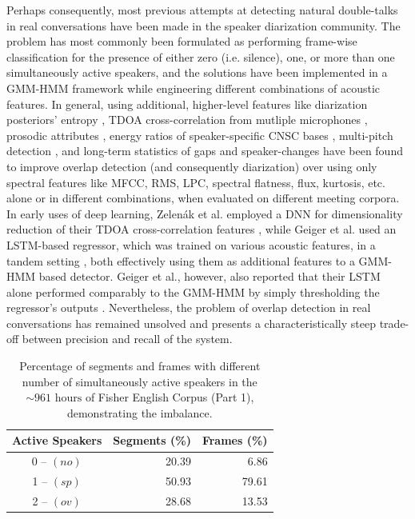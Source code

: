 \documentclass[a4paper]{article}
\begin{document}
Perhaps consequently, most previous attempts at detecting natural double-talks in real conversations
have been made in the speaker diarization community.
The problem has most commonly been formulated as performing frame-wise classification
for the presence of either
zero (i.e. silence), one, or more than one simultaneously active speakers,
and the solutions have been implemented in a GMM-HMM framework
while engineering different combinations of acoustic features.
In general, using additional, higher-level features like
diarization posteriors' entropy \cite{boakye_overlapped_2008},
TDOA cross-correlation from mutliple microphones \cite{zelenak_simultaneous_2012},
prosodic attributes \cite{zelenak_speaker_2012},
energy ratios of speaker-specific CNSC bases \cite{vipperla_speech_2012,geiger_speech_2012-1},
multi-pitch detection \cite{charlet_impact_2013},
and long-term statistics of gaps and speaker-changes \cite{yella_overlapping_2014}
have been found to improve overlap detection (and consequently diarization)
over using only spectral features like MFCC, RMS, LPC, spectral flatness, flux, kurtosis, etc.
alone or in different combinations, when evaluated on different meeting corpora.
In early uses of deep learning,
Zelen\'{a}k et al. employed a DNN for dimensionality reduction of their TDOA cross-correlation features \cite{zelenak_simultaneous_2012},
while Geiger et al. used an LSTM-based regressor,
which was trained on various acoustic features, in a tandem setting \cite{geiger_detecting_2013},
both effectively using them as additional features to a GMM-HMM based detector.
Geiger et al., however, also reported that their LSTM alone performed comparably to the GMM-HMM by simply thresholding the regressor's outputs \cite{geiger_detecting_2013}.
Nevertheless, the problem of overlap detection in real conversations has remained unsolved and
presents a characteristically steep trade-off between precision and recall of the system.

\begin{table}[t]
  \caption{Percentage of segments and frames with different number of simultaneously active speakers in the $\sim \!\!\! \text{961~hours}$ of Fisher English Corpus (Part 1), demonstrating the imbalance.}
  \centering
  \begin{tabular}{crr}
    \toprule
    \textbf{Active Speakers}  & \textbf{Segments (\%)}  & \textbf{Frames (\%)}  \\ \midrule
    0 -- $(no)$               & 20.39                   &  6.86                 \\
    1 -- $(sp)$               & 50.93                   & 79.61                 \\
    2 -- $(ov)$               & 28.68                   & 13.53                 \\
    \bottomrule
  \end{tabular}
  \label{tbl:actspk-perc}
  \vspace*{-\baselineskip}
\end{table}
\end{document}

